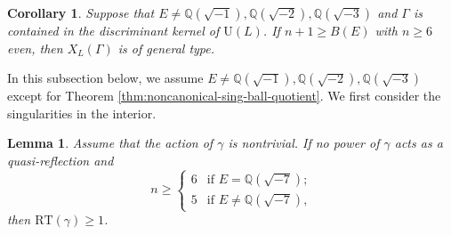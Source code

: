 \documentclass[11pt]{amsart}
\theoremstyle{plain}
\newtheorem{lem}[thm]{Lemma}
\newtheorem{cor}[thm]{Corollary}
\theoremstyle{definition}
\numberwithin{equation}{section}
\def\U{\mathrm{U}}
\newcommand{\bbQ}{\mathbb{Q}}
\begin{document}
\begin{cor}
    Suppose that $E \neq \bbQ(\sqrt{-1}), \bbQ(\sqrt{-2}), \bbQ(\sqrt{-3})$ and $\Gamma$ is contained in the discriminant kernel of $\U(L)$.
    If $n + 1 \geq B(E)$ with $n\geq 6$ even, then $X_L(\Gamma)$ is of general type.
\end{cor}


In this subsection below, we assume $E \neq \bbQ(\sqrt{-1}), \bbQ(\sqrt{-2}), \bbQ(\sqrt{-3})$ except for Theorem \ref{thm:noncanonical-sing-ball-quotient}.
We first consider the singularities in the interior.
\begin{lem}\label{lem_ball_interior_non-q-ref}
Assume that the action of $\gamma$
is nontrivial.
    If no power of $\gamma$ acts as a quasi-reflection and 
    \[
    n \geq 
    \begin{cases}
        6 & \text{if $E = \bbQ(\sqrt{-7})$;}\\
        5 & \text{if $E \neq \bbQ(\sqrt{-7})$,}
    \end{cases}
    \]
    then $\mathrm{RT}(\gamma)\geq1$.
\end{lem}
\end{document}
